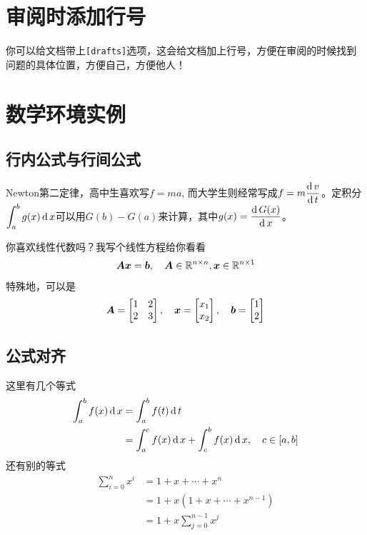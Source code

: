 \section{审阅时添加行号}
你可以给文档带上\lstinline|[drafts]|选项，这会给文档加上行号，方便在审阅的时候找到问题的具体位置，方便自己，方便他人！


\section{数学环境实例}

\subsection{行内公式与行间公式}

Newton第二定律，高中生喜欢写$f=ma$, 而大学生则经常写成$\displaystyle{f=m\frac{\operatorname{\mathrm{d}}{v}}{\operatorname{\mathrm{d}}{t}}}$。定积分
$\displaystyle{\int^b_a g(x)\operatorname{\mathrm{d}}x}$可以用$G(b)-G(a)$来计算，其中$\displaystyle g(x) = \frac{\operatorname{\mathrm{d}} {G(x)}}{\operatorname{\mathrm{d}} {x}}$。

你喜欢线性代数吗？我写个线性方程给你看看
\begin{equation}
\bm{A} \bm{x}= \bm{b}, \quad \bm{A}\in \mathbb{R}^{{n}\times {n}}, \bm{x}\in \mathbb{R}^{{n}\times {1}}
\end{equation}
特殊地，可以是
\begin{equation}
\bm{A} = \begin{bmatrix}
1 & 2 \\
2 & 3 
\end{bmatrix},\quad
\bm{x}=\begin{bmatrix}
x_1 \\ x_2
\end{bmatrix}, \quad
\bm{b} =\begin{bmatrix}
1 \\ 2
\end{bmatrix}
\end{equation}

\subsection{公式对齐}

这里有几个等式
\begin{equation}
\begin{split}
\int^b_a f(x)\operatorname{\mathrm{d}} x 
& = \int^b_a f(t)\operatorname{\mathrm{d}} t \\
& = \int^c_a f(x)\operatorname{\mathrm{d}} x + \int^b_c f(x)\operatorname{\mathrm{d}} x, \quad c\in [a,b] 
\end{split}
\end{equation}
还有别的等式
\begin{align}
\sum^n_{i=0} x^i 
&= 1 + x + \cdots + x^n \\
&= 1 + x(1 + x + \cdots + x^{n-1}) \\
& = 1 + x \sum^{n-1}_{j=0} x^j
\end{align}

